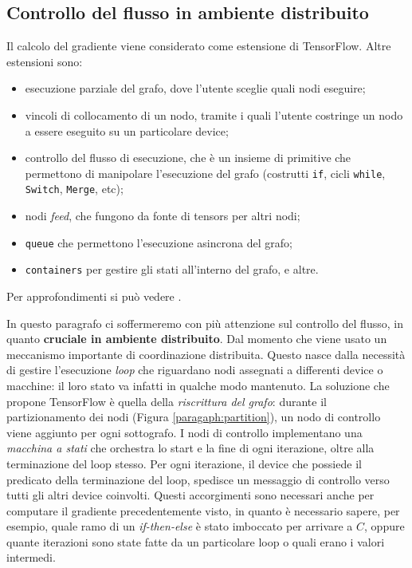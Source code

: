 \documentclass[DIV=calc, paper=a4, fontsize=11pt]{scrartcl}	 %
\begin{document}
\begin{multicols}{2}
				\subsection{Controllo del flusso in ambiente distribuito}
				Il calcolo del gradiente viene considerato come estensione di TensorFlow. Altre estensioni sono:
				\begin{itemize}
					\item esecuzione parziale del grafo, dove l'utente sceglie quali nodi eseguire;
					\item vincoli di collocamento di un nodo, tramite i quali l'utente costringe un nodo a essere eseguito su un particolare device;
					\item controllo del flusso di esecuzione, che è un insieme di primitive che permettono di manipolare l'esecuzione del grafo (costrutti \texttt{if}, cicli \texttt{while}, \texttt{Switch}, \texttt{Merge}, etc);
					\item nodi \textit{feed}, che fungono da fonte di tensors per altri nodi;
					\item \texttt{queue} che permettono l'esecuzione asincrona del grafo;
					\item\texttt{containers} per gestire gli stati all'interno del grafo, e altre.
				\end{itemize}
				Per approfondimenti si può vedere \cite{tf}.
				
				In questo paragrafo ci soffermeremo con più attenzione sul controllo del flusso, in quanto \textbf{cruciale in ambiente distribuito}. Dal momento che viene usato un meccanismo importante di coordinazione distribuita. Questo nasce dalla necessità di gestire l'esecuzione \textit{loop} che riguardano nodi assegnati a differenti device o macchine: il loro stato va infatti in qualche modo mantenuto. La soluzione che propone TensorFlow è quella della \textit{riscrittura del grafo}: durante il partizionamento dei nodi (Figura \ref{paragaph:partition}), un nodo di controllo viene aggiunto per ogni sottografo. I nodi di controllo implementano una \textit{macchina a stati} che orchestra lo start e la fine di ogni iterazione, oltre alla terminazione del loop stesso. Per ogni iterazione, il device che possiede il predicato della terminazione del loop, spedisce un messaggio di controllo verso tutti gli altri device coinvolti. Questi accorgimenti sono necessari anche per computare il gradiente precedentemente visto, in quanto è necessario sapere, per esempio, quale ramo di un \textit{if-then-else}	è stato imboccato per arrivare a $C$, oppure quante iterazioni sono state fatte da un particolare loop o quali erano i valori intermedi.
		

\end{multicols}
\end{document}
